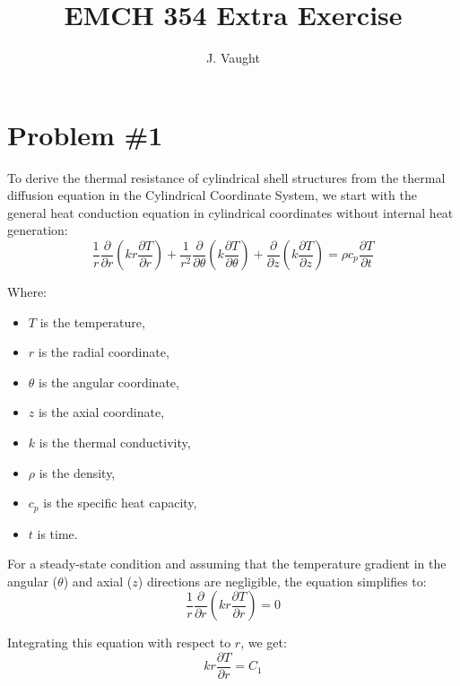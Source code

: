 \documentclass[12pt]{article}
\title{EMCH 354 Extra Exercise}
\author{J. Vaught}
\date{}
\numberwithin{equation}{section}
\begin{document}
\maketitle

\section{Problem \#1}
To derive the thermal resistance of cylindrical shell structures from the thermal diffusion equation in the Cylindrical Coordinate System, we start with the general heat conduction equation in cylindrical coordinates without internal heat generation:
\begin{equation}
    \frac{1}{r} \frac{\partial}{\partial r}\left( k r \frac{\partial T}{\partial r} \right) + \frac{1}{r^2} \frac{\partial}{\partial \theta}\left( k \frac{\partial T}{\partial \theta} \right) + \frac{\partial}{\partial z}\left( k \frac{\partial T}{\partial z} \right) = \rho c_p \frac{\partial T}{\partial t}
\end{equation}

Where:
\begin{itemize}
    \item \( T \) is the temperature,
    \item \( r \) is the radial coordinate,
    \item \( \theta \) is the angular coordinate,
    \item \( z \) is the axial coordinate,
    \item \( k \) is the thermal conductivity,
    \item \( \rho \) is the density,
    \item \( c_p \) is the specific heat capacity,
    \item \( t \) is time.
\end{itemize}

For a steady-state condition and assuming that the temperature gradient in the angular (\( \theta \)) and axial (\( z \)) directions are negligible, the equation simplifies to:
\begin{equation}
    \frac{1}{r} \frac{\partial}{\partial r}\left( k r \frac{\partial T}{\partial r} \right) = 0
\end{equation}

Integrating this equation with respect to \( r \), we get:
\begin{equation}
    k r \frac{\partial T}{\partial r} = C_1
\end{equation}
\end{document}
